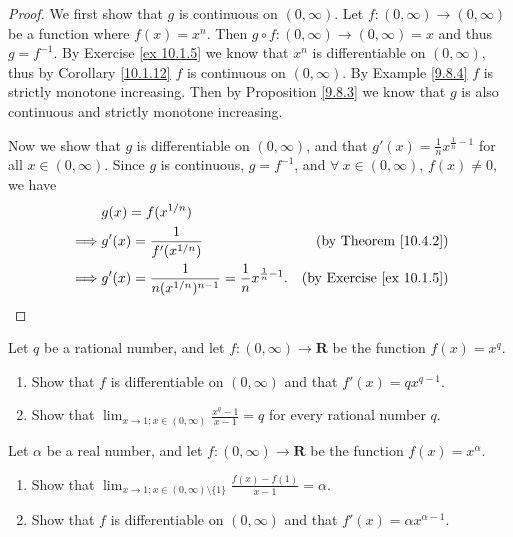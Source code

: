 \begin{proof}
    We first show that \(g\) is continuous on \((0, \infty)\).
    Let \(f : (0, \infty) \to (0, \infty)\) be a function where \(f(x) = x^n\).
    Then \(g \circ f : (0, \infty) \to (0, \infty) = x\) and thus \(g = f^{-1}\).
    By Exercise \ref{ex 10.1.5} we know that \(x^n\) is differentiable on \((0, \infty)\), thus by Corollary \ref{10.1.12} \(f\) is continuous on \((0, \infty)\).
    By Example \ref{9.8.4} \(f\) is strictly monotone increasing.
    Then by Proposition \ref{9.8.3} we know that \(g\) is also continuous and strictly monotone increasing.

    Now we show that \(g\) is differentiable on \((0, \infty)\), and that \(g'(x) = \frac{1}{n} x^{\frac{1}{n} - 1}\) for all \(x \in (0, \infty)\).
    Since \(g\) is continuous, \(g = f^{-1}\), and \(\forall\ x \in (0, \infty)\), \(f(x) \neq 0\), we have
    \begin{align*}
                 & g(x) = f(x^{1 / n})                                                                                               \\
        \implies & g'(x) = \frac{1}{f'(x^{1 / n})}                                            & \text{(by Theorem \ref{10.4.2})}     \\
        \implies & g'(x) = \frac{1}{n (x^{1 / n})^{n - 1}} = \frac{1}{n} x^{\frac{1}{n} - 1}. & \text{(by Exercise \ref{ex 10.1.5})}
    \end{align*}
\end{proof}

\begin{exercise}\label{ex 10.4.2}
    Let \(q\) be a rational number, and let \(f : (0, \infty) \to \mathbf{R}\) be the function \(f(x) = x^q\).
    \begin{enumerate}
        \item Show that \(f\) is differentiable on \((0, \infty)\) and that \(f'(x) = q x^{q - 1}\).
        \item Show that \(\lim_{x \to 1 ; x \in (0, \infty)} \frac{x^q - 1}{x - 1} = q\) for every rational number \(q\).
    \end{enumerate}
\end{exercise}

\begin{exercise}\label{ex 10.4.3}
    Let \(\alpha\) be a real number, and let \(f : (0, \infty) \to \mathbf{R}\) be the function \(f(x) = x^{\alpha}\).
    \begin{enumerate}
        \item Show that \(\lim_{x \to 1 ; x \in (0, \infty) \setminus \{1\}} \frac{f(x) - f(1)}{x - 1} = \alpha\).
        \item Show that \(f\) is differentiable on \((0, \infty)\) and that \(f'(x) = \alpha x^{\alpha - 1}\).
    \end{enumerate}
\end{exercise}